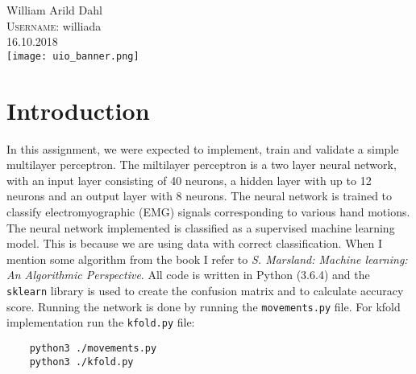 \documentclass[a4paper, norsk, 12pt]{article}
\begin{document}
\begin{titlepage}
William Arild Dahl\\ %
\textsc{Username:} williada\\[3cm]




{\large 16.10.2018}\\[2cm] %


\texttt{[image: uio\_banner.png]}\\[1cm] %


\vfill %
\end{titlepage}


\section{Introduction}


In this assignment, we were expected to implement, train and validate a simple multilayer perceptron. The miltilayer perceptron is a two layer neural network, with an input layer consisting of 40 neurons, a hidden layer with up to 12 neurons and an output layer with 8 neurons. The neural network is trained to classify electromyographic (EMG) signals corresponding to various hand motions. The neural network implemented is classified as a supervised machine learning model. This is because we are using data with correct classification.\newline\newline
When I mention some algorithm from the book I refer to \textit{S. Marsland: Machine learning: An Algorithmic Perspective}.  All code is written in Python (3.6.4) and the \texttt{sklearn} library is used to create the confusion matrix and to calculate accuracy score. Running the network is done by running the \texttt{movements.py} file. For kfold implementation run the \texttt{kfold.py} file:\newline\newline
	\begin{lstlisting}
	python3 ./movements.py
	python3 ./kfold.py

	\end{lstlisting}
\end{document}

